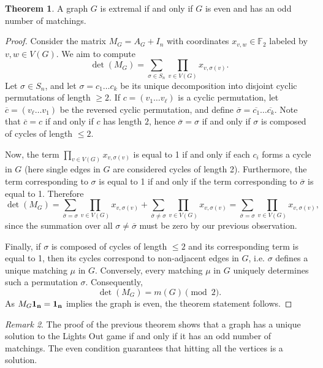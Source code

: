 \documentclass{amsart}
\theoremstyle{definition}
\newtheorem{theorem}{Theorem}[section]
\theoremstyle{remark}
\newtheorem{remark}[theorem]{Remark}
\def\FF{\mathbb{F}}
\begin{document}
\begin{theorem}\label{thm:oddmatchings}
    A graph $G$ is extremal if and only if $G$ is even and has an odd number of matchings.
\end{theorem}
\begin{proof}
    Consider the matrix $M_G = A_G+I_n$ with coordinates $x_{v,w}\in \FF_2$ labeled by $v,w\in V(G)$. We aim to compute
    \[
        \det(M_G) = \sum\limits_{\sigma\in S_n } \prod_{v\in V(G)} x_{v,\sigma(v)}.
    \]
    Let $\sigma\in S_n$, and let $\sigma=c_1 \dots c_k$ be its unique decomposition into disjoint cyclic permutations of length $\geq 2$. If $c=(v_1 \dots v_\ell)$ is a cyclic permutation, let $\overline{c}=(v_\ell \dots v_1)$ be the reversed cyclic permutation, and define $\overline{\sigma}=\overline{c_1}\dots\overline{c_k}$. Note that $\overline{c}=c$ if and only if $c$ has length $2$, hence $\overline{\sigma}=\sigma$ if and only if $\sigma$ is composed of cycles of length $\leq 2$. 
    
    Now, the term $\prod_{v\in V(G)} x_{v,\sigma(v)}$ is equal to 1 if and only if each $c_i$ forms a cycle in $G$ (here single edges in $G$ are considered cycles of length 2). Furthermore, the term corresponding to $\sigma$ is equal to 1 if and only if the term corresponding to $\overline{\sigma}$ is equal to 1. Therefore
    \[
        \det(M_G) = \sum\limits_{\overline{\sigma}=\sigma } \prod_{v\in V(G)} x_{v,\sigma(v)} + \sum\limits_{\overline{\sigma}\neq \sigma } \prod_{v\in V(G)} x_{v,\sigma(v)} = \sum\limits_{\overline{\sigma}=\sigma } \prod_{v\in V(G)} x_{v,\sigma(v)},
    \]
    since the summation over all $\sigma\neq \overline{\sigma}$ must be zero by our previous observation. 
    
    Finally, if $\sigma$ is composed of cycles of length $\leq 2$ and its corresponding term is equal to 1, then its cycles correspond to non-adjacent edges in $G$, i.e. $\sigma$ defines a unique matching $\mu$ in $G$. Conversely, every matching $\mu$ in $G$ uniquely determines such a permutation $\sigma$. Consequently,
    \[
        \det(M_G) = m(G)\pmod2.
    \] 
    As $M_G \bf{1}_n=\bf{1}_n$ implies the graph is even, the theorem statement follows.
\end{proof}

\begin{remark}
    The proof of the previous theorem shows that a graph has a unique solution to the Lights Out game if and only if it has an odd number of matchings. The even condition guarantees that hitting all the vertices is a solution. 
\end{remark}
\end{document}
